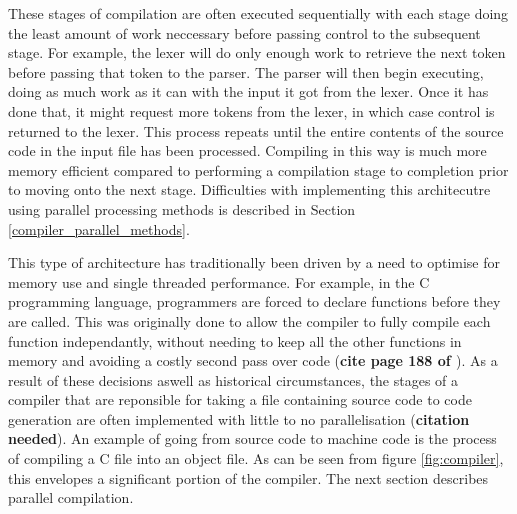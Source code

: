 These stages of compilation are often executed sequentially with each stage
doing the least amount of work neccessary before passing control to the
subsequent stage. For example, the lexer will do only enough work to retrieve
the next token before passing that token to the parser. The parser will then
begin executing, doing as much work as it can with the input it got from the
lexer. Once it has done that, it might request more tokens from the lexer,
in which case control is returned to the lexer. This process repeats until
the entire contents of the source code in the input file has been processed.
Compiling in this way is much more memory efficient compared to performing
a compilation stage to completion prior to moving onto the next stage.
Difficulties with implementing this architecutre using parallel processing
methods is described in Section \ref{compiler_parallel_methods}.

This type of architecture has traditionally been driven by a need to optimise
for memory use and single threaded performance. For example, in the C
programming language, programmers are forced to declare functions before they
are called. This was originally done to allow the compiler to fully compile
each function independantly, without needing to keep all the other functions in
memory and avoiding a costly second pass over code (\textbf{cite page 188 of \cite{scott_programming_2015}}).
As a result of these decisions aswell as historical circumstances, the stages
of a compiler that are reponsible  for taking a file containing source code
to code generation are often implemented with little to no parallelisation
(\textbf{citation needed}). An example of going from source code to machine code
is the process of compiling a C file into an object file. As can be seen from
figure \ref{fig:compiler}, this envelopes a significant portion of the compiler.
The next section describes parallel compilation.


